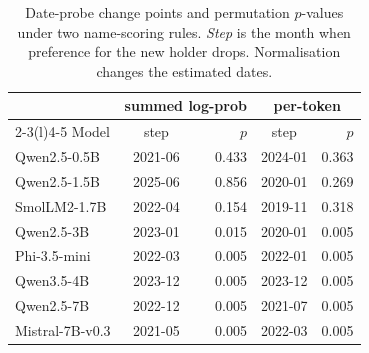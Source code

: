 \begin{table}[t]\centering\small\setlength\tabcolsep{4pt}
\begin{tabular}{@{}l cr cr@{}}
\toprule
 & \multicolumn{2}{c}{summed log-prob} & \multicolumn{2}{c}{per-token} \\ \cmidrule(lr){2-3}\cmidrule(l){4-5}
Model & step & $p$ & step & $p$ \\
\midrule
Qwen2.5-0.5B & 2021-06 & 0.433 & 2024-01 & 0.363 \\
Qwen2.5-1.5B & 2025-06 & 0.856 & 2020-01 & 0.269 \\
SmolLM2-1.7B & 2022-04 & 0.154 & 2019-11 & 0.318 \\
Qwen2.5-3B & 2023-01 & 0.015 & 2020-01 & 0.005 \\
Phi-3.5-mini & 2022-03 & 0.005 & 2022-01 & 0.005 \\
Qwen3.5-4B & 2023-12 & 0.005 & 2023-12 & 0.005 \\
Qwen2.5-7B & 2022-12 & 0.005 & 2021-07 & 0.005 \\
Mistral-7B-v0.3 & 2021-05 & 0.005 & 2022-03 & 0.005 \\
\bottomrule\end{tabular}
\caption{Date-probe change points and permutation $p$-values under two name-scoring rules. \emph{Step} is the month when preference for the new holder drops. Normalisation changes the estimated dates.}
\label{tab:cutoffnorm}\end{table}
